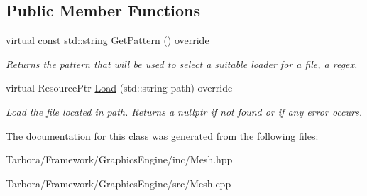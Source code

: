 \subsection*{Public Member Functions}
\begin{DoxyCompactItemize}
\item 
\mbox{\label{classTarbora_1_1MeshResourceLoader_a8129f1427365896b811581007b3627ef}} 
virtual const std\+::string \hyperlink{classTarbora_1_1MeshResourceLoader_a8129f1427365896b811581007b3627ef}{Get\+Pattern} () override
\begin{DoxyCompactList}\small\item\em Returns the pattern that will be used to select a suitable loader for a file, a regex. \end{DoxyCompactList}\item 
\mbox{\label{classTarbora_1_1MeshResourceLoader_a22628e9fd9f9672708690b56063395dc}} 
virtual Resource\+Ptr \hyperlink{classTarbora_1_1MeshResourceLoader_a22628e9fd9f9672708690b56063395dc}{Load} (std\+::string path) override
\begin{DoxyCompactList}\small\item\em Load the file located in {\itshape path}. Returns a nullptr if not found or if any error occurs. \end{DoxyCompactList}\end{DoxyCompactItemize}


The documentation for this class was generated from the following files\+:\begin{DoxyCompactItemize}
\item 
Tarbora/\+Framework/\+Graphics\+Engine/inc/Mesh.\+hpp\item 
Tarbora/\+Framework/\+Graphics\+Engine/src/Mesh.\+cpp\end{DoxyCompactItemize}
